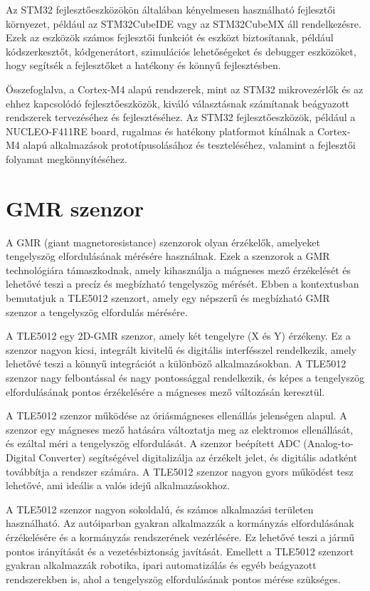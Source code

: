 Az STM32 fejlesztőeszközökön általában kényelmesen használható fejlesztői környezet, például az STM32CubeIDE vagy az STM32CubeMX áll rendelkezésre. Ezek az eszközök számos fejlesztői funkciót és eszközt biztosítanak, például kódszerkesztőt, kódgenerátort, szimulációs lehetőségeket és debugger eszközöket, hogy segítsék a fejlesztőket a hatékony és könnyű fejlesztésben.

Összefoglalva, a Cortex-M4 alapú rendszerek, mint az STM32 mikrovezérlők és az ehhez kapcsolódó fejlesztőeszközök, kiváló választásnak számítanak beágyazott rendszerek tervezéséhez és fejlesztéséhez. Az STM32 fejlesztőeszközök, például a NUCLEO-F411RE board, rugalmas és hatékony platformot kínálnak a Cortex-M4 alapú alkalmazások prototípusolásához és teszteléséhez, valamint a fejlesztői folyamat megkönnyítéséhez.

\section{GMR szenzor}
A GMR (giant magnetoresistance) szenzorok olyan érzékelők, amelyeket tengelyszög elfordulásának mérésére használnak. Ezek a szenzorok a GMR technológiára támaszkodnak, amely kihasználja a mágneses mező érzékelését és lehetővé teszi a precíz és megbízható tengelyszög mérését. Ebben a kontextusban bemutatjuk a TLE5012 szenzort, amely egy népszerű és megbízható GMR szenzor a tengelyszög elfordulás mérésére.

A TLE5012 egy 2D-GMR szenzor, amely két tengelyre (X és Y) érzékeny. Ez a szenzor nagyon kicsi, integrált kivitelű és digitális interfésszel rendelkezik, amely lehetővé teszi a könnyű integrációt a különböző alkalmazásokban. A TLE5012 szenzor nagy felbontással és nagy pontossággal rendelkezik, és képes a tengelyszög elfordulásának pontos érzékelésére a mágneses mező változásán keresztül.

A TLE5012 szenzor működése az óriásmágneses ellenállás jelenségen alapul. A szenzor egy mágneses mező hatására változtatja meg az elektromos ellenállását, és ezáltal méri a tengelyszög elfordulását. A szenzor beépített ADC (Analog-to-Digital Converter) segítségével digitalizálja az érzékelt jelet, és digitális adatként továbbítja a rendszer számára. A TLE5012 szenzor nagyon gyors működést tesz lehetővé, ami ideális a valós idejű alkalmazásokhoz.

A TLE5012 szenzor nagyon sokoldalú, és számos alkalmazási területen használható. Az autóiparban gyakran alkalmazzák a kormányzás elfordulásának érzékelésére és a kormányzás rendszerének vezérlésére. Ez lehetővé teszi a jármű pontos irányítását és a vezetésbiztonság javítását. Emellett a TLE5012 szenzort gyakran alkalmazzák robotika, ipari automatizálás és egyéb beágyazott rendszerekben is, ahol a tengelyszög elfordulásának pontos mérése szükséges.

